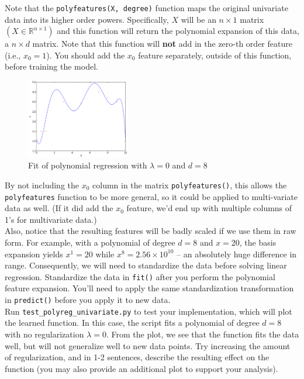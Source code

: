 \documentclass{article}
\begin{document}
\begin{aprob}
    Note that the \texttt{polyfeatures(X, degree)} function maps the original univariate data into its higher order powers.  Specifically, $X$ will be an $n \times 1$ matrix $(X \in \mathbb{R}^{n \times 1})$ and this function will return the polynomial expansion of this data, a $n \times d$ matrix.  Note that this function will {\bf not} add in the zero-th order feature (i.e., $x_0 = 1$).  You should add the $x_0$ feature separately, outside of this function, before training the model.

    \begin{figure}
        \centering
        \vspace{-1em}
        \includegraphics[width=0.4\textwidth]{../img/polyregDegree8.png}
        \vspace{-1em}
        \caption{Fit of polynomial regression with $\lambda = 0$ and $d = 8$}\label{fig:polyregUnivariate}
        \vspace{-2em}
    \end{figure}

    By not including the $x_0$ column in the matrix \texttt{polyfeatures()}, this allows the \texttt{polyfeatures} function to be more general, so it could be applied to multi-variate data as well. (If it did add the $x_0$ feature, we'd end up with multiple columns of 1's for multivariate data.)\\

    Also, notice that the resulting features will be badly scaled if we use them in raw form.  For example, with a polynomial of degree $d = 8$ and $x = 20$, the basis expansion yields $x^1 = 20$ while $x^8 = 2.56 \times 10^{10}$ -- an
    absolutely huge difference in range.  Consequently, we will need to standardize the data before solving linear regression.  Standardize the data in \texttt{fit()} after you perform the polynomial feature expansion.  You'll need to apply the same standardization transformation in \texttt{predict()} before you apply it to new data.\\

    Run \texttt{test\_polyreg\_univariate.py} to test your implementation, which will plot the learned function.  In this case, the script fits a polynomial of degree $d=8$ with no regularization $\lambda = 0$.  From the plot, we see that the function fits the data well, but will not generalize well to new data points.  Try increasing the amount of regularization, and in 1-2 sentences, describe the resulting effect on the function (you may also provide an additional plot to support your analysis).


\end{aprob}
\end{document}
